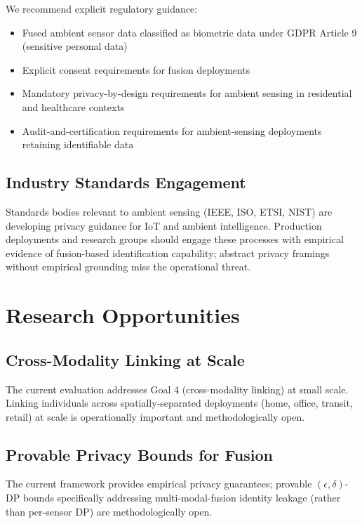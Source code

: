 \documentclass[sigconf,nonacm]{acmart}
\begin{document}
We recommend explicit regulatory guidance:

\begin{itemize}
  \item Fused ambient sensor data classified as biometric data
        under GDPR Article 9 (sensitive personal data)
  \item Explicit consent requirements for fusion deployments
  \item Mandatory privacy-by-design requirements for ambient
        sensing in residential and healthcare contexts
  \item Audit-and-certification requirements for ambient-sensing
        deployments retaining identifiable data
\end{itemize}

\subsection{Industry Standards Engagement}

Standards bodies relevant to ambient sensing (IEEE, ISO, ETSI,
NIST) are developing privacy guidance for IoT and ambient
intelligence. Production deployments and research groups should
engage these processes with empirical evidence of fusion-based
identification capability; abstract privacy framings without
empirical grounding miss the operational threat.

\section{Research Opportunities}

\subsection{Cross-Modality Linking at Scale}

The current evaluation addresses Goal 4 (cross-modality linking)
at small scale. Linking individuals across spatially-separated
deployments (home, office, transit, retail) at scale is
operationally important and methodologically open.

\subsection{Provable Privacy Bounds for Fusion}

The current framework provides empirical privacy guarantees;
provable $(\epsilon, \delta)$-DP bounds specifically addressing
multi-modal-fusion identity leakage (rather than per-sensor DP)
are methodologically open.
\end{document}
